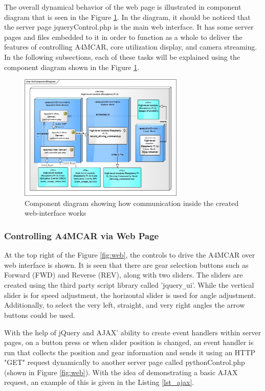 The overall dynamical behavior of the web page is illustrated in component diagram that is seen in the Figure \ref{fig:weboverallbehavior}. In the diagram, it should be noticed that the server page jqueryControl.php is the main web interface. It has some server pages and files embedded to it in order to function as a whole to deliver the features of controlling A4MCAR, core utilization display, and camera streaming. In the following subsections, each of these tasks will be explained using the component diagram shown in the Figure \ref{fig:weboverallbehavior}.

\begin{figure}[!ht]
	\centering
	\includegraphics[width=0.7\textwidth]{content/images/weboverallbehavior.png}
	\caption{Component diagram showing how communication inside the created web-interface works}
	\label{fig:weboverallbehavior}
\end{figure}

\subsubsection{Controlling A4MCAR via Web Page}
At the top right of the Figure \ref{fig:web}, the controls to drive the A4MCAR over web interface is shown. It is seen that there are gear selection buttons such as Forward (FWD) and Reverse (REV), along with two sliders. The sliders are created using the third party script library called 'jquery\texttt{\_}ui'. While the vertical slider is for speed adjustment, the horizontal slider is used for angle adjustment. Additionally, to select the very left, straight, and very right angles the arrow buttons could be used. 

With the help of jQuery and AJAX' ability to create event handlers within server pages, on a button press or when slider position is changed, an event handler is run that collects the position and gear information and sends it using an HTTP "GET" request dynamically to another server page called pythonControl.php (shown in Figure \ref{fig:web}). With the idea of demonstrating a basic AJAX request, an example of this is given in the Listing \ref{lst_ajax}.

